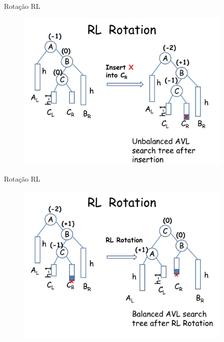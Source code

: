 \documentclass[aspectratio=169]{beamer}
\begin{document}

\begin{frame}{Rotação RL}
\begin{figure}[!h]
  \centering
  \includegraphics[width=300pt]{imagens/rl_rotation.png}
  \label{fig_rl_rotation}
\end{figure}
\end{frame}


\begin{frame}{Rotação RL}
\begin{figure}[!h]
  \centering
  \includegraphics[width=300pt]{imagens/rl_rotation1.png}
  \label{fig_rl_rotation1}
\end{figure}
\end{frame}

\end{document}
